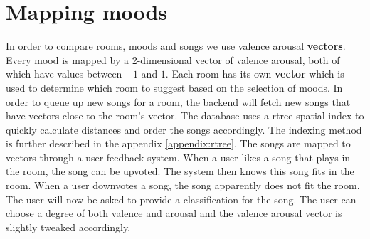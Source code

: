 \section{Mapping moods}
\label{mapping-moods}
In order to compare rooms, moods and songs we use \gls{valence} \gls{arousal} \textbf{vectors}.
Every mood is mapped by a 2-dimensional vector of \gls{valence} \gls{arousal}, both of which have values between $-1$ and $1$.
Each room has its own \textbf{vector} which is used to determine which room to suggest based on the selection of moods.
In order to queue up new songs for a room, the backend will fetch new songs that have vectors close to the room's vector.
The database uses a \gls{rtree} spatial index to quickly calculate distances and order the songs accordingly.
The indexing method is further described in the appendix \ref{appendix:rtree}.
The songs are mapped to vectors through a user feedback system.
When a user likes a song that plays in the room, the song can be upvoted.
The system then knows this song fits in the room.
When a user downvotes a song, the song apparently does not fit the room.
The user will now be asked to provide a classification for the song.
The user can choose a degree of both valence and arousal and the valence arousal vector is slightly tweaked accordingly.
